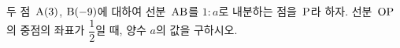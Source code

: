 두 점~$\mathrm{A}(3)$, $\mathrm{B}(-9)$에 대하여 선분~$\mathrm{AB}$를 $1:a$로 내분하는 점을~$\mathrm{P}$라 하자. 선분~$\mathrm{OP}$의 중점의 좌표가 $\dfrac{1}{2}$일 때, 양수 $a$의 값을 구하시오. 
